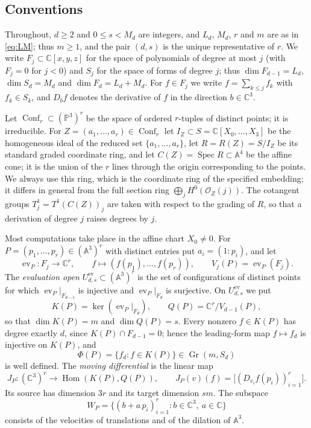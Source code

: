 \documentclass{amsart}
\theoremstyle{definition}
\theoremstyle{remark}
\numberwithin{equation}{section}
\newcommand{\CC}{\mathbb{C}}
\newcommand{\PP}{\mathbb{P}}
\newcommand{\A}{\mathbb{A}}
\DeclareMathOperator{\ev}{ev}
\DeclareMathOperator{\Gr}{Gr}
\DeclareMathOperator{\Hom}{Hom}
\DeclareMathOperator{\Spec}{Spec}
\begin{document}
\subsection{Conventions}
Throughout, $d\ge 2$ and $0\le s<M_d$ are integers, and $L_d$, $M_d$, $r$ and
$m$ are as in \eqref{eq:LM}; thus $m\ge1$, and the pair $(d,s)$ is the unique
representative of $r$. We write $F_j\subset\CC[x,y,z]$ for the space of
polynomials of degree at most $j$ (with $F_j=0$ for $j<0$) and $S_j$ for the space of
forms of degree $j$; thus $\dim F_{d-1}=L_d$, $\dim S_d=M_d$ and
$\dim F_d=L_d+M_d$. For $f\in F_j$ we write $f=\sum_{k\le j}f_k$ with $f_k\in S_k$,
and $D_bf$ denotes the derivative of $f$ in the direction $b\in\CC^3$.

Let $\operatorname{Conf}_r\subset(\PP^3)^r$ be the space of ordered $r$-tuples of
distinct points; it is irreducible. For $Z=(a_1,\dots,a_r)\in\operatorname{Conf}_r$
let $I_Z\subset S=\CC[X_0,\dots,X_3]$ be the homogeneous ideal of the reduced
set $\{a_1,\dots,a_r\}$, let $R=R(Z)=S/I_Z$ be its standard graded coordinate ring,
and let $C(Z)=\Spec R\subset\A^4$ be the affine cone; it is the union of the $r$ lines
through the origin corresponding to the points. We always use this ring, which is
the coordinate ring of the specified embedding; it differs in general from the full
section ring $\bigoplus_j H^0(\mathcal O_Z(j))$. The cotangent groups
$T^1_j=T^1(C(Z))_j$ are taken with respect to the grading of $R$, so that a
derivation of degree $j$ raises degrees by $j$.

Most computations take place in the affine chart $X_0\ne 0$. For
$P=(p_1,\dots,p_r)\in(\A^3)^r$ with distinct entries put $a_i=(1:p_i)$, and let
\[
  \ev_P\colon F_j\to\CC^r,\qquad f\mapsto (f(p_1),\dots,f(p_r)),\qquad
  V_j(P)=\ev_P(F_j).
\]
The \emph{evaluation open} $U^{\mathrm{ev}}_{d,s}\subset(\A^3)^r$ is the set of
configurations of distinct points for which $\ev_P|_{F_{d-1}}$ is injective and
$\ev_P|_{F_d}$ is surjective. On $U^{\mathrm{ev}}_{d,s}$ we put
\begin{equation}\label{eq:KQ}
  K(P)=\ker(\ev_P|_{F_d}),\qquad Q(P)=\CC^r/V_{d-1}(P),
\end{equation}
so that $\dim K(P)=m$ and $\dim Q(P)=s$. Every nonzero $f\in K(P)$ has degree
exactly $d$, since $K(P)\cap F_{d-1}=0$; hence the leading-form map
$f\mapsto f_d$ is injective on $K(P)$, and
\[
  \Phi(P)=\{f_d: f\in K(P)\}\in\Gr(m,S_d)
\]
is well defined. The \emph{moving differential} is the linear map
\begin{equation}\label{eq:JP}
  J_P\colon(\CC^3)^r\to\Hom(K(P),Q(P)),\qquad
  J_P(v)(f)=\bigl[(D_{v_i}f(p_i))_{i=1}^r\bigr].
\end{equation}
Its source has dimension $3r$ and its target dimension $sm$. The subspace
\begin{equation}\label{eq:WP}
  W_P=\{(b+a\,p_i)_{i=1}^r: b\in\CC^3,\ a\in\CC\}
\end{equation}
consists of the velocities of translations and of the dilation of $\A^3$.
\end{document}
